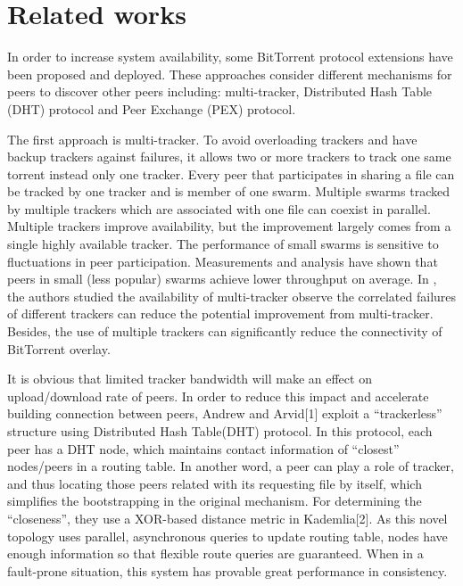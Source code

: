 \documentclass[conference]{IEEEtran}
\begin{document}
\section{Related works}
In order to increase system availability, some BitTorrent protocol extensions have been proposed and deployed. These approaches consider different mechanisms for peers to discover other peers including: multi-tracker, Distributed Hash Table (DHT) protocol and Peer Exchange (PEX) protocol.

The first approach is multi-tracker. To avoid overloading trackers and have backup trackers against failures, it allows two or more trackers to track one same torrent instead only one tracker. Every peer that participates in sharing a file can be tracked by one tracker and is member of one swarm. Multiple swarms tracked by multiple trackers which are associated with one file can coexist in parallel.  Multiple trackers improve availability, but the improvement largely comes from a single highly available tracker. The performance of small swarms is sensitive to fluctuations in peer participation. Measurements and analysis have shown that peers in small (less popular) swarms achieve lower throughput on average\cite{Swarming}. In \cite{Availability}, the authors studied the availability of multi-tracker observe the correlated failures of different trackers can reduce the potential improvement from multi-tracker. Besides, the use of multiple trackers can significantly reduce the connectivity of BitTorrent overlay.

It is obvious that limited tracker bandwidth will make an effect on upload/download rate of peers. In order to reduce this impact and accelerate building connection between peers, Andrew and Arvid[1] exploit a “trackerless” structure using Distributed Hash Table(DHT) protocol. In this protocol, each peer has a DHT node, which maintains contact information of “closest” nodes/peers in a routing table. In another word, a peer can play a role of tracker, and thus locating those peers related with its requesting file by itself, which simplifies the bootstrapping in the original mechanism. For determining the “closeness”, they use a XOR-based distance metric in Kademlia[2]. As this novel topology uses parallel, asynchronous queries to update routing table, nodes have enough information so that flexible route queries are guaranteed. When in a fault-prone situation, this system has provable great performance in consistency.
\end{document}
